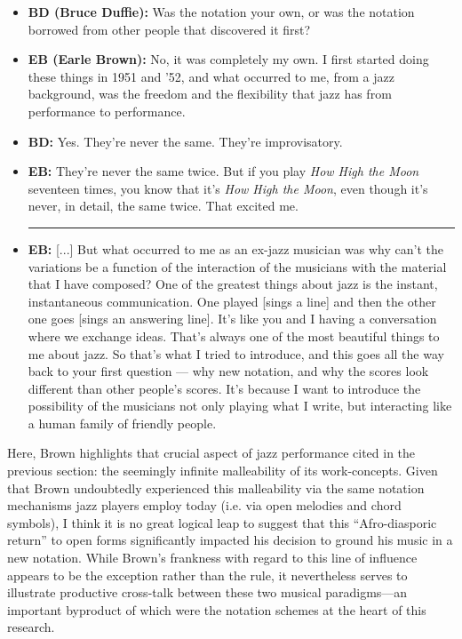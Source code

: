         \begin{smallquote}
            \begin{itemize}
                \item \textbf{BD (Bruce Duffie):} Was the notation your own, or was the notation borrowed from other people that discovered it first?
                \item \textbf{EB (Earle Brown):} No, it was completely my own. I first started doing these things in 1951 and '52, and what occurred to me, from a jazz background, was the freedom and the flexibility that jazz has from performance to performance.
                \item \textbf{BD:} Yes. They're never the same. They're improvisatory.
                \item \textbf{EB:} They're never the same twice. But if you play \textit{How High the Moon} seventeen times, you know that it's \textit{How High the Moon}, even though it's never, in detail, the same twice. That excited me.

                \centering
                    \noindent\rule{2cm}{0.4pt}
                    
                \justifying
                \item \textbf{EB:} [...] But what occurred to me as an ex-jazz musician was why can't the variations be a function of the interaction of the musicians with the material that I have composed? One of the greatest things about jazz is the instant, instantaneous communication.  One played [sings a line] and then the other one goes [sings an answering line].  It’s like you and I having a conversation where we exchange ideas.  That’s always one of the most beautiful things to me about jazz.  So that’s what I tried to introduce, and this goes all the way back to your first question — why new notation, and why the scores look different than other people’s scores.  It’s because I want to introduce the possibility of the musicians not only playing what I write, but interacting like a human family of friendly people.\autocite{Duffie}
            \end{itemize}
        \end{smallquote}


    \noindent Here, Brown highlights that crucial aspect of jazz performance cited in the previous section: the seemingly infinite malleability of its work-concepts. Given that Brown undoubtedly experienced this malleability via the same notation mechanisms jazz players employ today (i.e. via open melodies and chord symbols), I think it is no great logical leap to suggest that this ``Afro-diasporic return'' to open forms significantly impacted his decision to ground his music in a new notation. While Brown's frankness with regard to this line of influence appears to be the exception rather than the rule, it nevertheless serves to illustrate productive cross-talk between these two musical paradigms---an important byproduct of which were the notation schemes at the heart of this research.



